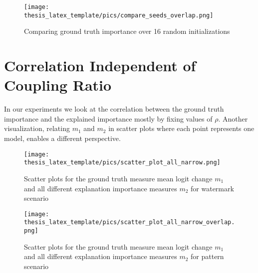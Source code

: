 \begin{figure}[!htb]
	\centering
	\label{fig:compare_seeds_overlap}
	\texttt{[image: thesis\_latex\_template/pics/compare\_seeds\_overlap.png]}
	\caption[Pattern Scenario Compare Seeds]{Comparing ground truth importance over 16 random initializations}
\end{figure}



\section{Correlation Independent of Coupling Ratio}

In our experiments we look at the correlation between the ground truth importance and the explained importance mostly by fixing values of $\rho$. Another visualization, relating $m_1$ and $m_2$ in scatter plots where each point represents one model, enables a different 
perspective. 

\begin{figure}[!htb]
	\centering
	\label{fig:scatter_plot_watermark}
	\texttt{[image: thesis\_latex\_template/pics/scatter\_plot\_all\_narrow.png]}
	\caption[Correlation $m_1, m_2$ Watermark Scenario]{Scatter plots for the ground truth measure mean logit change $m_1$ and all different explanation importance measures $m_2$ for watermark scenario}
\end{figure}

\begin{figure}[!htb]
	\centering
	\label{fig:scatter_plot_pattern}
	\texttt{[image: thesis\_latex\_template/pics/scatter\_plot\_all\_narrow\_overlap.png]}
	\caption[Correlation $m_1, m_2$ Pattern Scenario]{Scatter plots for the ground truth measure mean logit change $m_1$ and all different explanation importance measures $m_2$ for pattern scenario}
\end{figure}